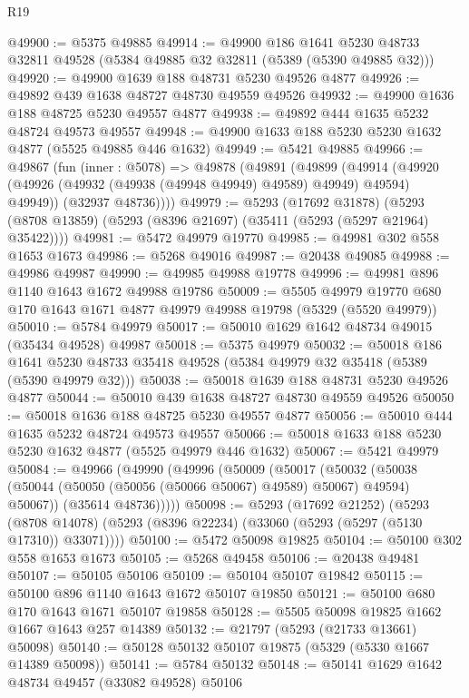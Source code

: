 \begin{lexlean}{R19}
\begin{coremodule}
@49900 := @5375 @49885
@49914 := @49900
    @186
    @1641
    @5230
    @48733
    @32811
    @49528
    (@5384 @49885 @32 @32811 (@5389 (@5390 @49885 @32)))
@49920 := @49900 @1639 @188 @48731 @5230 @49526 @4877
@49926 := @49892 @439 @1638 @48727 @48730 @49559 @49526
@49932 := @49900 @1636 @188 @48725 @5230 @49557 @4877
@49938 := @49892 @444 @1635 @5232 @48724 @49573 @49557
@49948 := @49900 @1633 @188 @5230 @5230 @1632 @4877 (@5525 @49885 @446 @1632)
@49949 := @5421 @49885
@49966 := @49867
    (fun (inner : @5078) =>
    @49878
      (@49891
        (@49899
          (@49914 (@49920 (@49926 (@49932 (@49938 (@49948 @49949) @49589) @49949) @49594) @49949))
          (@32937 @48736))))
@49979 := @5293
    (@17692 @31878)
    (@5293 (@8708 @13859) (@5293 (@8396 @21697) (@35411 (@5293 (@5297 @21964) @35422))))
@49981 := @5472 @49979 @19770
@49985 := @49981 @302 @558 @1653 @1673
@49986 := @5268 @49016
@49987 := @20438 @49085
@49988 := @49986 @49987
@49990 := @49985 @49988 @19778
@49996 := @49981 @896 @1140 @1643 @1672 @49988 @19786
@50009 := @5505
    @49979
    @19770
    @680
    @170
    @1643
    @1671
    @4877
    @49979
    @49988
    @19798
    (@5329 (@5520 @49979))
@50010 := @5784 @49979
@50017 := @50010 @1629 @1642 @48734 @49015 (@35434 @49528) @49987
@50018 := @5375 @49979
@50032 := @50018
    @186
    @1641
    @5230
    @48733
    @35418
    @49528
    (@5384 @49979 @32 @35418 (@5389 (@5390 @49979 @32)))
@50038 := @50018 @1639 @188 @48731 @5230 @49526 @4877
@50044 := @50010 @439 @1638 @48727 @48730 @49559 @49526
@50050 := @50018 @1636 @188 @48725 @5230 @49557 @4877
@50056 := @50010 @444 @1635 @5232 @48724 @49573 @49557
@50066 := @50018 @1633 @188 @5230 @5230 @1632 @4877 (@5525 @49979 @446 @1632)
@50067 := @5421 @49979
@50084 := @49966
    (@49990
      (@49996
        (@50009
          (@50017
            (@50032 (@50038 (@50044 (@50050 (@50056 (@50066 @50067) @49589) @50067) @49594) @50067))
            (@35614 @48736)))))
@50098 := @5293
    (@17692 @21252)
    (@5293 (@8708 @14078) (@5293 (@8396 @22234) (@33060 (@5293 (@5297 (@5130 @17310)) @33071))))
@50100 := @5472 @50098 @19825
@50104 := @50100 @302 @558 @1653 @1673
@50105 := @5268 @49458
@50106 := @20438 @49481
@50107 := @50105 @50106
@50109 := @50104 @50107 @19842
@50115 := @50100 @896 @1140 @1643 @1672 @50107 @19850
@50121 := @50100 @680 @170 @1643 @1671 @50107 @19858
@50128 := @5505 @50098 @19825 @1662 @1667 @1643 @257 @14389
@50132 := @21797 (@5293 (@21733 @13661) @50098)
@50140 := @50128 @50132 @50107 @19875 (@5329 (@5330 @1667 @14389 @50098))
@50141 := @5784 @50132
@50148 := @50141 @1629 @1642 @48734 @49457 (@33082 @49528) @50106

\end{coremodule}
\end{lexlean}
